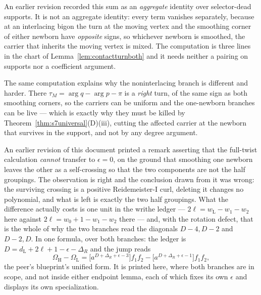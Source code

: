 \begin{remark}\label{rem:aggregateclosed}
An earlier revision recorded this sum as an \emph{aggregate} identity over
selector-dead supports. It is not an aggregate identity: every term vanishes separately, because at an
interlacing bigon the turn at the moving vertex and the smoothing corner of
either newborn have \emph{opposite} signs, so whichever newborn is smoothed,
the carrier that inherits the moving vertex is mixed. The computation is three
lines in the chart of Lemma~\ref{lem:contactturnboth} and it needs neither a
pairing on supports nor a coefficient argument.

The same computation explains why the noninterlacing branch is different and
harder. There $\tau_M=\arg q-\arg p-\pi$ is a \emph{right} turn, of the same
sign as both smoothing corners, so the carriers can be uniform and the
one-newborn branches can be live --- which is exactly why they must be killed by
Theorem~\ref{thm:s7universal}(D)(iii), cutting the affected carrier at the newborn that
survives in the support, and not by any degree argument.
\end{remark}

\begin{remark}\label{rem:whynotni}
An earlier revision of this document printed a remark asserting that the
full-twist calculation \emph{cannot} transfer to $\epsilon=0$, on the ground
that smoothing one newborn leaves the other as a self-crossing so that the two
components are not the half groupings. The observation is right and the
conclusion drawn from it was wrong: the surviving crossing is a positive
Reidemeister-I curl, deleting it changes no polynomial, and what is left is
exactly the two half groupings. What the difference actually costs is one unit
in the writhe ledger --- $2\ell=w_{\mathrm L}-w_1-w_2$ here against
$2\ell=w_0+1-w_1-w_2$ there --- and, with the rotation defect, that is the
whole of why the two branches read the diagonals $D-4,D-2$ and $D-2,D$. In one
formula, over both branches: the ledger is
$D=d_{\mathrm L}+2\ell+1-\epsilon-\Delta_R$ and the jump reads
\[
   \Omega_{\mathrm H}-\Omega_{\mathrm L}
   =\bigl[a^{D+\Delta_R+\epsilon-3}\bigr]f_1f_2
    -\bigl[a^{D+\Delta_R+\epsilon-1}\bigr]f_1f_2 ,
\]
the peer's blueprint's unified form. It is printed here, where both branches
are in scope, and not inside either endpoint lemma, each of which fixes its own
$\epsilon$ and displays its own specialization.
\end{remark}
